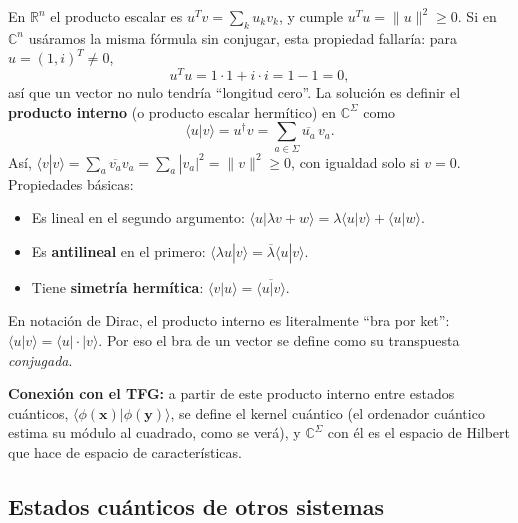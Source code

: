 \documentclass[11pt, a4paper, twoside, openright]{report}
\begin{document}
\begin{tcolorbox}[colback=teal!5!white,colframe=teal!75!black,title=\textbf{Nota Teórica: ¿Por qué hay que conjugar? El producto interno complejo}]
En $\mathbb{R}^n$ el producto escalar es $u^T v = \sum_k u_k v_k$, y cumple $u^T u = \|u\|^2 \geq 0$. Si en $\mathbb{C}^n$ usáramos la misma fórmula sin conjugar, esta propiedad fallaría: para $u = (1, i)^T \neq 0$,
\[ u^T u = 1\cdot 1 + i\cdot i = 1 - 1 = 0, \]
así que un vector no nulo tendría ``longitud cero''. La solución es definir el \textbf{producto interno} (o producto escalar hermítico) en $\mathbb{C}^\Sigma$ como
\[ \langle u | v \rangle = u^\dagger v = \sum_{a \in \Sigma} \overline{u_a}\, v_a. \]
Así, $\langle v|v\rangle = \sum_a \overline{v_a} v_a = \sum_a |v_a|^2 = \|v\|^2 \geq 0$, con igualdad solo si $v = 0$. Propiedades básicas:
\begin{itemize}
    \item Es lineal en el segundo argumento: $\langle u | \lambda v + w\rangle = \lambda\langle u|v\rangle + \langle u|w\rangle$.
    \item Es \textbf{antilineal} en el primero: $\langle \lambda u | v\rangle = \overline{\lambda}\langle u|v\rangle$.
    \item Tiene \textbf{simetría hermítica}: $\langle v|u\rangle = \overline{\langle u|v\rangle}$.
\end{itemize}
En notación de Dirac, el producto interno es literalmente ``bra por ket'': $\langle u|v\rangle = \langle u|\cdot|v\rangle$. Por eso el bra de un vector se define como su transpuesta \textit{conjugada}.

\textbf{Conexión con el TFG:} a partir de este producto interno entre estados cuánticos, $\langle\phi(\mathbf{x})|\phi(\mathbf{y})\rangle$, se define el kernel cuántico (el ordenador cuántico estima su módulo al cuadrado, como se verá), y $\mathbb{C}^\Sigma$ con él es el espacio de Hilbert que hace de espacio de características.
\end{tcolorbox}

\subsection{Estados cuánticos de otros sistemas}
\end{document}
